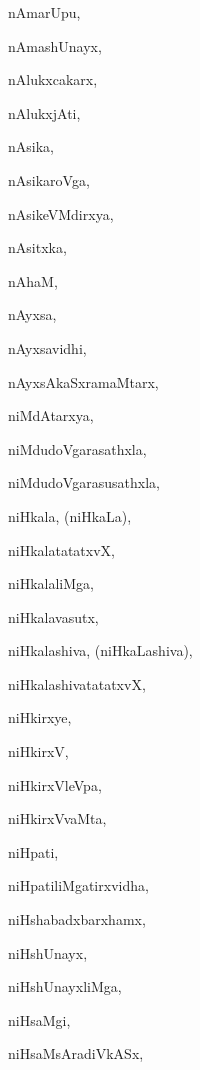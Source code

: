 \begin{multicols}{2}
{nAmarUpu}, \pageref{nAmarUpu}

{nAmashUnayx}, \pageref{nAmashUnayx}

{nAlukxcakarx}, \pageref{nAlukxcakarx}

{nAlukxjAti}, \pageref{nAlukxjAti}

{nAsika}, \pageref{nAsika}

{nAsikaroVga}, \pageref{nAsikaroVga}

{nAsikeVMdirxya}, \pageref{nAsikeVMdirxya}

{nAsitxka}, \pageref{nAsitxka}

{nAhaM}, \pageref{nAhaM}

{nAyxsa}, \pageref{nAyxsa}

{nAyxsavidhi}, \pageref{nAyxsavidhi}

{nAyxsAkaSxramaMtarx}, \pageref{nAyxsAkaSxramaMtarx}

{niMdAtarxya}, \pageref{niMdAtarxya}

{niMdudoVgarasathxla}, \pageref{niMdudoVgarasathxla}

{niMdudoVgarasusathxla}, \pageref{niMdudoVgarasusathxla}

{niHkala, (niHkaLa)}, \pageref{niHkala,niHkaLa}

{niHkalatatatxvX}, \pageref{niHkalatatatxvX}

{niHkalaliMga}, \pageref{niHkalaliMga}

{niHkalavasutx}, \pageref{niHkalavasutx}

{niHkalashiva, (niHkaLashiva)}, \pageref{niHkalashiva,niHkaLashiva}

{niHkalashivatatatxvX}, \pageref{niHkalashivatatatxvX}

{niHkirxye}, \pageref{niHkirxye}

{niHkirxV}, \pageref{niHkirxV}

{niHkirxVleVpa}, \pageref{niHkirxVleVpa}

{niHkirxVvaMta}, \pageref{niHkirxVvaMta}

{niHpati}, \pageref{niHpati}

{niHpatiliMgatirxvidha}, \pageref{niHpatiliMgatirxvidha}

{niHshabadxbarxhamx}, \pageref{niHshabadxbarxhamx}

{niHshUnayx}, \pageref{niHshUnayx}

{niHshUnayxliMga}, \pageref{niHshUnayxliMga}

{niHsaMgi}, \pageref{niHsaMgi}

{niHsaMsAradiVkASx}, \pageref{niHsaMsAradiVkASx}


\end{multicols}
